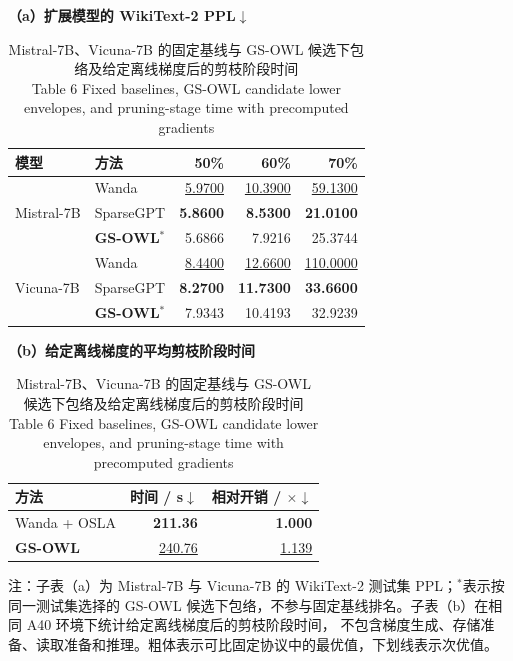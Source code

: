 \documentclass[UTF8,fontset=fandol]{ctexart}
\renewcommand{\arraystretch}{1.08}
\newcommand{\best}[1]{\textbf{#1}}
\newcommand{\second}[1]{\underline{#1}}
\begin{document}
\begin{table}[!htbp]
\centering
\caption{Mistral-7B、Vicuna-7B 的固定基线与 GS-OWL 候选下包络及给定离线梯度后的剪枝阶段时间\\
Table 6 Fixed baselines, GS-OWL candidate lower envelopes, and pruning-stage time with precomputed gradients}
\label{tab:generalization}
\begin{minipage}{0.62\textwidth}
\centering
\scriptsize
\textbf{（a）扩展模型的 WikiText-2 PPL$\downarrow$}\par\vspace{2pt}
\setlength{\tabcolsep}{3.4pt}
\renewcommand{\arraystretch}{0.98}
\begin{tabular}{llrrr}
\toprule
模型 & 方法 & 50\% & 60\% & 70\% \\
\midrule
\multirow{3}{*}{Mistral-7B}
 & Wanda & \second{5.9700} & \second{10.3900} & \second{59.1300} \\
 & SparseGPT & \best{5.8600} & \best{8.5300} & \best{21.0100} \\
 & \textbf{GS-OWL}$^\ast$ & 5.6866 & 7.9216 & 25.3744 \\
\midrule
\multirow{3}{*}{Vicuna-7B}
 & Wanda & \second{8.4400} & \second{12.6600} & \second{110.0000} \\
 & SparseGPT & \best{8.2700} & \best{11.7300} & \best{33.6600} \\
 & \textbf{GS-OWL}$^\ast$ & 7.9343 & 10.4193 & 32.9239 \\
\bottomrule
\end{tabular}
\end{minipage}
\hfill
\begin{minipage}{0.34\textwidth}
\centering
\scriptsize
\textbf{（b）给定离线梯度的平均剪枝阶段时间}\par\vspace{2pt}
\setlength{\tabcolsep}{3.6pt}
\renewcommand{\arraystretch}{1.00}
\begin{tabular}{lrr}
\toprule
方法 & 时间 / s$\downarrow$ & 相对开销 / $\times$$\downarrow$ \\
\midrule
Wanda + OSLA & \best{211.36} & \best{1.000} \\
\textbf{GS-OWL} & \second{240.76} & \second{1.139} \\
\bottomrule
\end{tabular}
\end{minipage}
\vspace{2pt}
\parbox{0.96\textwidth}{\scriptsize
注：子表（a）为 Mistral-7B 与 Vicuna-7B 的 WikiText-2 测试集 PPL；$^\ast$表示按同一测试集选择的
GS-OWL 候选下包络，不参与固定基线排名。子表（b）在相同 A40 环境下统计给定离线梯度后的剪枝阶段时间，
不包含梯度生成、存储准备、读取准备和推理。粗体表示可比固定协议中的最优值，下划线表示次优值。}
\end{table}
\end{document}
